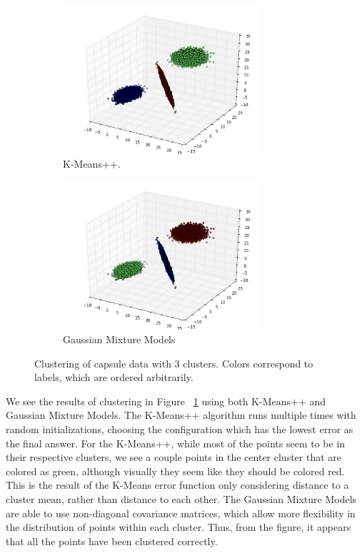 \documentclass[11pt]{amsart}
\begin{document}
\begin{figure}
	\begin{subfigure}{\textwidth}
		\centering		
		\includegraphics[width=0.8\textwidth]{capsule_k_means_plot.png}
		\caption{K-Means++.}
	\end{subfigure}
	\begin{subfigure}{\textwidth}
		\centering
		\includegraphics[width=0.8\textwidth]{capsule_gauss_plot.png}
		\caption{Gaussian Mixture Models}
	\end{subfigure}
	\caption{Clustering of capsule data with 3 clusters. Colors correspond to labels, which are ordered arbitrarily.}
	\label{fig:clustering}
\end{figure}

We see the results of clustering in Figure ~\ref{fig:clustering} using both K-Means++ and Gaussian Mixture Models. 
The K-Means++ algorithm runs multiple times with random initializations, choosing the configuration which has the lowest error as the final answer. For the K-Means++, while most of the points seem to be in their respective clusters, we see a couple points in the center cluster that are colored as green, although visually they seem like they should be colored red. This is the result of the K-Means error function only considering distance to a cluster mean, rather than distance to each other. 
The Gaussian Mixture Models are able to use non-diagonal covariance matrices, which allow more flexibility in the distribution of points within each cluster. Thus, from the figure, it appears that all the points have been clustered correctly.
\end{document}
